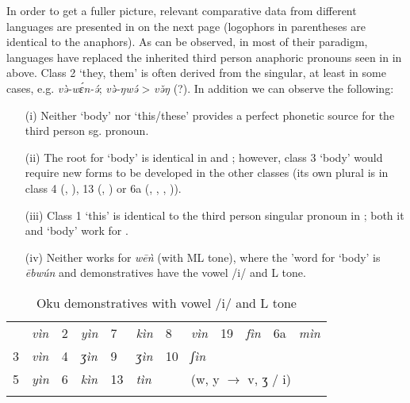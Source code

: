 \documentclass[output=paper]{langsci/langscibook}
\begin{document}
In order to get a fuller picture, relevant comparative data from different  languages are presented in  on the next page (logophors in parentheses are identical to the anaphors). As can be observed, in most of their paradigm,  languages have replaced the inherited third person anaphoric pronouns seen in  in  above. Class 2 ‘they, them’ is often derived from the singular, at least in some cases, e.g.  \textit{və̀-wɛ́n{\textasciigrave}-ə́};  \textit{və̀-ŋw}\textit{ə́}  > \textit{və̌ŋ} (?). In addition we can observe the following:

\largerpage[3]
\begin{enumerate}
\item[(i)]  Neither ‘body’ nor  ‘this/these’ provides a perfect phonetic source for the third person sg. pronoun.

\item[(ii)]  The root for ‘body’ is identical in  and ; however, class 3 ‘body’ would require new forms to be developed in the other classes (its own plural is in class 4 (, ), 13 (, ) or 6a (, , , )).

\item[(iii)]  Class 1 ‘this’ is identical to the third person singular pronoun in ; both it and ‘body’ work for .

\item[(iv)]  Neither works for  \textit{wēǹ} (with ML tone), where the 'word for ‘body’ is \textit{ēbwún} and demonstratives have the vowel /i/ and L tone.
\end{enumerate}

\begin{table}
\caption{Oku demonstratives with vowel /i/ and L tone} 
\label{tab:grassfields:extra1}
\begin{tabularx}{\textwidth}{llllllllllll}
\lsptoprule
1 & \textit{vìn}  &  2 & \textit{yìn}  &  7 & \textit{kìn}  &  8 & \textit{vìn}  &  19 & \textit{fìn}  &  6a & \textit{mìn}\\
3 & \textit{vìn}  &  4 & \textit{ʒìn}  &  9 & \textit{ʒìn}  &  10 & \textit{ʃìn}  &    &    &  \\
5 & \textit{yìn}  &  6 & \textit{kìn}  &  13 & \textit{tìn}  &    &  \multicolumn{5}{l}{      (w, y ${\rightarrow}$ v, ʒ  / {\longrule} i)}\\
\lspbottomrule
\end{tabularx}
\end{table}
\end{document}
